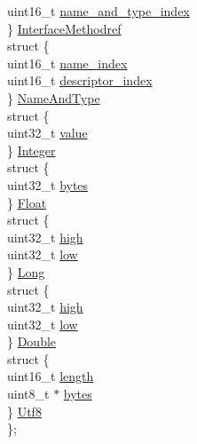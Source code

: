 \begin{DoxyCompactItemize}
\begin{tabbing}
\>\>uint16\_t \hyperlink{structcp__info_ad7a8733b3b078818a59cc33eb1fa7dc3}{name\_and\_type\_index}\\
\>\} \hyperlink{structcp__info_aa83f8676e24f088925c6502b78765d04}{InterfaceMethodref}\\
\>struct \{\\
\>\>uint16\_t \hyperlink{structcp__info_a3c8912fe67e7d3f9ce150aa6f5bec22d}{name\_index}\\
\>\>uint16\_t \hyperlink{structcp__info_aef3c90a1a874ca4acbc49029aaa0d4cb}{descriptor\_index}\\
\>\} \hyperlink{structcp__info_a992e807724524d5cdd537a646478e7c3}{NameAndType}\\
\>struct \{\\
\>\>uint32\_t \hyperlink{structcp__info_abdf544fc1b14cb7bfcb5ecabb74a0e84}{value}\\
\>\} \hyperlink{structcp__info_af859585c09920ad4589135731a78e772}{Integer}\\
\>struct \{\\
\>\>uint32\_t \hyperlink{structcp__info_a34ed0f597e452fbeb97cb0f551a678bb}{bytes}\\
\>\} \hyperlink{structcp__info_aa58271cb0f8e9d8827b2e99380f4b777}{Float}\\
\>struct \{\\
\>\>uint32\_t \hyperlink{structcp__info_a73d116220b0d9e7674ab0bd34bcb155a}{high}\\
\>\>uint32\_t \hyperlink{structcp__info_ae325e667e647b781e0691686049e50ec}{low}\\
\>\} \hyperlink{structcp__info_a000e2b8074c512960f81e10a1946ae94}{Long}\\
\>struct \{\\
\>\>uint32\_t \hyperlink{structcp__info_a73d116220b0d9e7674ab0bd34bcb155a}{high}\\
\>\>uint32\_t \hyperlink{structcp__info_ae325e667e647b781e0691686049e50ec}{low}\\
\>\} \hyperlink{structcp__info_aa42214f97b75a51fadba707aa3c29749}{Double}\\
\>struct \{\\
\>\>uint16\_t \hyperlink{structcp__info_afa18d3ff419ce300281ca759a20a2cc3}{length}\\
\>\>uint8\_t $\ast$ \hyperlink{structcp__info_a34c1da9248b884af89b5c91d55087100}{bytes}\\
\>\} \hyperlink{structcp__info_a25ee4592009bd74535de00796abf40eb}{Utf8}\\
\}; \\

\end{tabbing}\end{DoxyCompactItemize}


